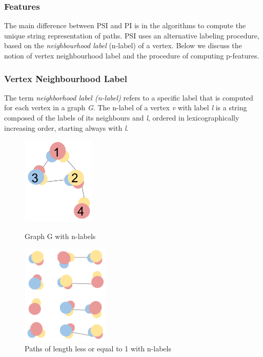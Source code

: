 \documentclass{l4proj}
\begin{document}
\subsubsection{Features}
The main difference between PSI and PI is in the algorithms to compute the unique string representation of paths. PSI uses an alternative labeling procedure, based on the \emph{neighbourhood label} (n-label) of a vertex. Below we discuss the notion of vertex neighbourhood label and the procedure of computing p-features.

\subsubsection{Vertex Neighbourhood Label}
The term \emph{neighborhood label (n-label)} refers to a specific label that is computed for each vertex in a graph \emph{G}. The n-label of a vertex \emph{v} with label \emph{l} is a string composed of the labels of its neighbours and \emph{l}, ordered in lexicographically increasing order, starting always with \emph{l}.

\begin{figure}
\centering
\begin{minipage}[t]{.4\textwidth}
  \centering
  \includegraphics[height=4.2cm,width=3.5cm]{images/graphs/nlabels.png}
  \caption{Graph G with n-labels}
  \label{nlabels}
\end{minipage}
\begin{minipage}[t]{.4\textwidth}
  \centering
  \includegraphics[height=4.8cm,width=4.2cm]{images/nfeatures.png}
  \caption{Paths of length less or equal to 1 with n-labels}
  \label{nfeatures}
\end{minipage}
\end{figure}
\end{document}
